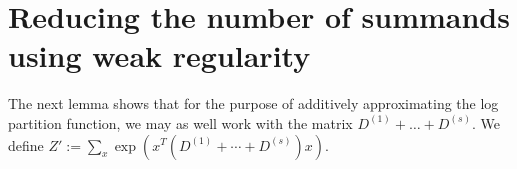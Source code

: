 \documentclass[final, 12pt]{colt2018}
\theoremstyle{definition}
\theoremstyle{plain}
\begin{document}
\begin{comment}
Note that for any fixed $y\geq0$
and any $j\in[m]$, we can define i.i.d random variables $X_{1},\dots,X_{q}$
which take values $\{H\left(\sigma\left(\sum_{j=1}^{m}y_{j}a_{ji}\right)\right)\}_{i=1}^{n}$
with probability $1/n$. Then, $\sum_{i\in Q}H\left(\sigma\left(\sum_{j=1}^{m}y_{j}a_{ji}\right)\right)=X_{1}+\dots+X_{q}$
so that by Hoeffding, we get that $Pr[\left|\sum_{i\in Q}H\left(\sigma\left(\sum_{j=1}^{m}y_{j}a_{ji}\right)\right)-\frac{q}{n}\sum_{i=1}^{n}H\left(\sigma\left(\sum_{j=1}^{m}y_{j}a_{ji}\right)\right)\right|\geq\gamma q]\leq\exp(-2\gamma^{2}q)$.
Since $b'_{j}$ is just a rescaling of $b_{j}$, we only need to analyse
the term $\sum_{j=1}^{m}y_{j}\sum_{k\in Q}a_{jk}\sigma\left(\sum_{j=1}^{m}y_{j}a_{jk}\right)=\sum_{k\in Q}\sigma\left(\sum_{j=1}^{m}y_{j}a_{jk}\right)\sum_{j=1}^{m}y_{j}a_{jk}$.
By Hoeffding, this quantity deviates by $\gamma q$ from its expectation
with probability at most $\exp(-\frac{2\gamma^{2}q^{2}}{q(\sum_{j=1}^{m}y_{j})^{2}})\leq\exp(-\frac{2\gamma^{2}q}{m^{2}|y_{\infty}|^{2}})=\exp(-\frac{2\gamma^{2}q}{16s^{2}|y_{\infty}|^{2}})$
so we will be done if we can show that $|y_{\infty}^{*}|$ can be
taken to be sufficiently small where $y^{*}$ is the optimizer of
the dual program. In particular, we will show that we can take $|y_{\infty}^{*}|=O(\frac{1}{\gamma})$
\end{comment}

\iffalse %
\section{Reducing the number of summands using weak regularity}%
The next lemma shows that for the purpose of additively approximating
the log partition function, we may as well work with the matrix $D^{(1)}+\dots+D^{(s)}$. We define $Z' := \sum_x \exp(x^T(D^{(1)} + \cdots + D^{(s)}) x)$. 
\end{document}
